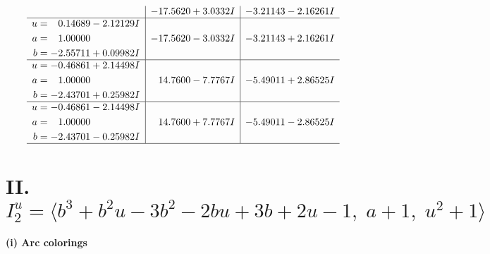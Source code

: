 \documentclass[1p]{elsarticle_modified}
\theoremstyle{definition}
\begin{document}
$$\begin{array}{c|c|c}
 & -17.5620 + 3.0332 I & -3.21143 - 2.16261 I \\ \hline\begin{aligned}
u &= \phantom{-}0.14689 - 2.12129 I \\
a &= \phantom{-}1.00000\phantom{ +0.000000I} \\
b &= -2.55711 + 0.09982 I\end{aligned}
 & -17.5620 - 3.0332 I & -3.21143 + 2.16261 I \\ \hline\begin{aligned}
u &= -0.46861 + 2.14498 I \\
a &= \phantom{-}1.00000\phantom{ +0.000000I} \\
b &= -2.43701 + 0.25982 I\end{aligned}
 & \phantom{-}14.7600 - 7.7767 I & -5.49011 + 2.86525 I \\ \hline\begin{aligned}
u &= -0.46861 - 2.14498 I \\
a &= \phantom{-}1.00000\phantom{ +0.000000I} \\
b &= -2.43701 - 0.25982 I\end{aligned}
 & \phantom{-}14.7600 + 7.7767 I & -5.49011 - 2.86525 I\\
 \hline 
 \end{array}$$\newpage\newpage\renewcommand{\arraystretch}{1}
\centering \section*{II. $I^u_{2}= \langle b^3+b^2 u-3 b^2-2 b u+3 b+2 u-1,\;a+1,\;u^2+1 \rangle$}
\flushleft \textbf{(i) Arc colorings}\\
\end{document}

